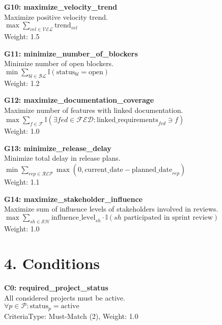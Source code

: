 \documentclass[12pt]{article}
\begin{document}
    \item \textbf{G10: maximize\_velocity\_trend} \\
    Maximize positive velocity trend. \\
    $\max \sum_{vel \in \mathcal{VEL}} \text{trend}_{vel}$ \\
    Weight: 1.5

    \item \textbf{G11: minimize\_number\_of\_blockers} \\
    Minimize number of open blockers. \\
    $\min \sum_{bl \in \mathcal{BL}} \mathbb{I}(\text{status}_{bl} = \text{open})$ \\
    Weight: 1.2

    \item \textbf{G12: maximize\_documentation\_coverage} \\
    Maximize number of features with linked documentation. \\
    $\max \sum_{f \in \mathcal{F}} \mathbb{I}(\exists fed \in \mathcal{FED}: \text{linked\_requirements}_{fed} \ni f)$ \\
    Weight: 1.0

    \item \textbf{G13: minimize\_release\_delay} \\
    Minimize total delay in release plans. \\
    $\min \sum_{rep \in \mathcal{REP}} \max(0, \text{current\_date} - \text{planned\_date}_{rep})$ \\
    Weight: 1.1

    \item \textbf{G14: maximize\_stakeholder\_influence} \\
    Maximize sum of influence levels of stakeholders involved in reviews. \\
    $\max \sum_{sh \in \mathcal{SH}} \text{influence\_level}_{sh} \cdot \mathbb{I}(sh \text{ participated in sprint review})$ \\
    Weight: 1.0

\section{4. Conditions}
\item \textbf{C0: required\_project\_status} \\
    All considered projects must be active. \\
    $\forall p \in \mathcal{P}: \text{status}_p = \text{active}$ \\
    CriteriaType: Must-Match (2), Weight: 1.0
\end{document}
